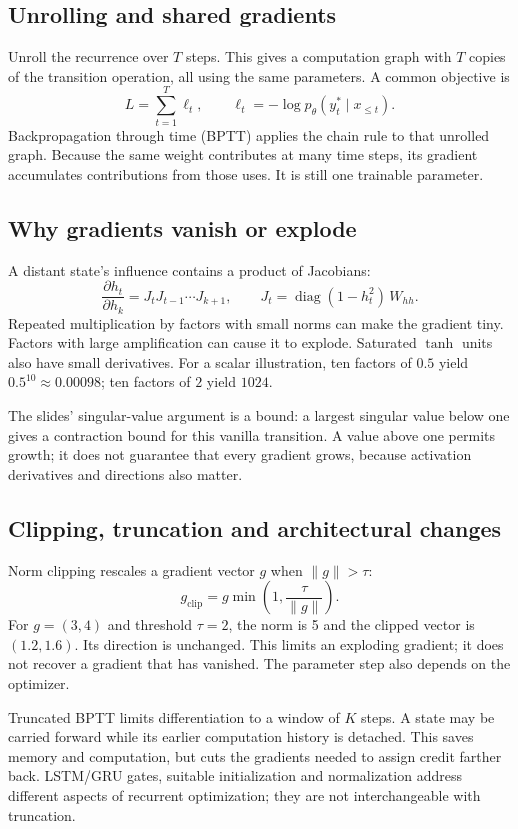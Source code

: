 \documentclass[11pt]{article}
\begin{document}
\subsection{Unrolling and shared gradients}
Unroll the recurrence over $T$ steps. This gives a computation graph with $T$ copies of the transition operation, all using the same parameters. A common objective is
\[
L=\sum_{t=1}^{T}\ell_t,\qquad
\ell_t=-\log p_\theta(y_t^*\mid x_{\leq t}).
\]
Backpropagation through time (BPTT) applies the chain rule to that unrolled graph. Because the same weight contributes at many time steps, its gradient accumulates contributions from those uses. It is still one trainable parameter.

\subsection{Why gradients vanish or explode}
A distant state's influence contains a product of Jacobians:
\[
\frac{\partial h_t}{\partial h_k}
=J_tJ_{t-1}\cdots J_{k+1},\qquad
J_t=\operatorname{diag}(1-h_t^2)\,W_{hh}.
\]
Repeated multiplication by factors with small norms can make the gradient tiny. Factors with large amplification can cause it to explode. Saturated $\tanh$ units also have small derivatives. For a scalar illustration, ten factors of $0.5$ yield $0.5^{10}\approx0.00098$; ten factors of $2$ yield $1024$.

The slides' singular-value argument is a bound: a largest singular value below one gives a contraction bound for this vanilla transition. A value above one permits growth; it does not guarantee that every gradient grows, because activation derivatives and directions also matter.

\subsection{Clipping, truncation and architectural changes}
Norm clipping rescales a gradient vector $g$ when $\|g\|>\tau$:
\[
g_{\mathrm{clip}}=g\min\left(1,\frac{\tau}{\|g\|}\right).
\]
For $g=(3,4)$ and threshold $\tau=2$, the norm is 5 and the clipped vector is $(1.2,1.6)$. Its direction is unchanged. This limits an exploding gradient; it does not recover a gradient that has vanished. The parameter step also depends on the optimizer.

Truncated BPTT limits differentiation to a window of $K$ steps. A state may be carried forward while its earlier computation history is detached. This saves memory and computation, but cuts the gradients needed to assign credit farther back. LSTM/GRU gates, suitable initialization and normalization address different aspects of recurrent optimization; they are not interchangeable with truncation.
\end{document}
